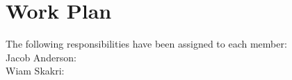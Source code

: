 \section*{Work Plan}
The following responsibilities have been assigned to each member:\\
Jacob Anderson:\\
Wiam Skakri: